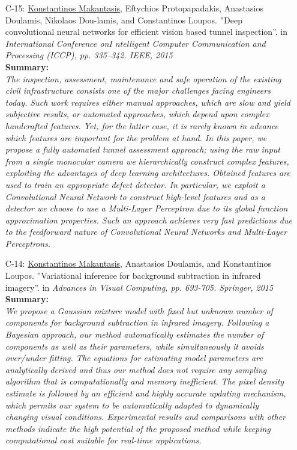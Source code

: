 \documentclass[a4paper,10pt]{article}
\begin{document}
\begin{itemize}
	\item [C-15:]\underline{Konstantinos Makantasis}, Eftychios Protopapadakis, Anastasios Doulamis, Nikolaos Dou-lamis, and Constantinos Loupos. ''Deep convolutional neural networks for efficient vision based tunnel inspection''. in \textit{International Conference onI ntelligent Computer Communication and Processing (ICCP), pp. 335–342. IEEE, 2015}\\
	\textbf{Summary:}\\
	\textit{The inspection, assessment, maintenance and safe operation of the existing civil infrastructure consists one of the major challenges facing engineers today. Such work requires either manual approaches, which are slow and yield subjective results, or automated approaches, which depend upon complex handcrafted features. Yet, for the latter case, it is rarely known in advance which features are important for the problem at hand. In this paper, we propose a fully automated tunnel assessment approach; using the raw input from a single monocular camera we hierarchically construct complex features, exploiting the advantages of deep learning architectures. Obtained features are used to train an appropriate defect detector. In particular, we exploit a Convolutional Neural Network to construct high-level features and as a detector we choose to use a Multi-Layer Perceptron due to its global function approximation properties. Such an approach achieves very fast predictions due to the feedforward nature of Convolutional Neural Networks and Multi-Layer Perceptrons.}
	
	\item [C-14:]\underline{Konstantinos Makantasis}, Anastasios Doulamis, and Konstantinos Loupos. ''Variational inference for background subtraction in infrared imagery''. in \textit{Advances in Visual Computing, pp. 693-705. Springer, 2015}\\
	\textbf{Summary:}\\
	\textit{We propose a Gaussian mixture model with fixed but unknown number of components for background subtraction in infrared imagery. Following a Bayesian approach, our method automatically estimates the number of components as well as their parameters, while simultaneously it avoids over/under fitting. The equations for estimating model parameters are analytically derived and thus our method does not require any sampling algorithm that is computationally and memory inefficient. The pixel density estimate is followed by an efficient and highly accurate updating mechanism, which permits our system to be automatically adapted to dynamically changing visual conditions. Experimental results and comparisons with other methods indicate the high potential of the proposed method while keeping computational cost suitable for real-time applications.}
	

\end{itemize}
\end{document}
